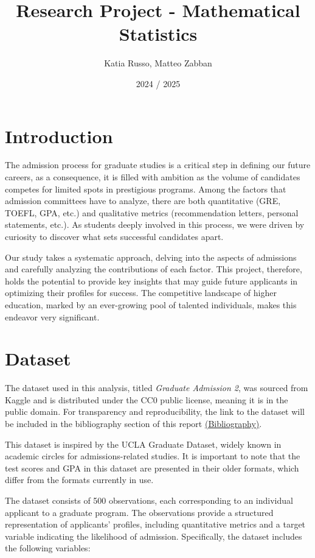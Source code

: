 \documentclass[12pt]{article}
\title{Research Project - Mathematical Statistics}
\author{Katia Russo, Matteo Zabban}
\date{2024 / 2025}
\begin{document}
\maketitle
\tableofcontents

\newpage
\section{Introduction}
The admission process for graduate studies is a critical step in defining our future careers, as a consequence, it is filled with ambition as the volume of candidates competes for limited spots in prestigious programs. Among the factors that admission committees have to analyze, there are both quantitative (GRE, TOEFL, GPA, etc.) and qualitative metrics (recommendation letters, personal statements, etc.). As students deeply involved in this process, we were driven by curiosity to discover what sets successful candidates apart.

\vspace{10pt}
\indent Our study takes a systematic approach, delving into the aspects of admissions and carefully analyzing the contributions of each factor. This project, therefore, holds the potential to provide key insights that may guide future applicants in optimizing their profiles for success. The competitive landscape of higher education, marked by an ever-growing pool of talented individuals, makes this endeavor very significant.


\section{Dataset}
The dataset used in this analysis, titled \textit{Graduate Admission 2}, was sourced from Kaggle and is distributed under the CC0 public license, meaning it is in the public domain. For transparency and reproducibility, the link to the dataset will be included in the bibliography section of this report \hyperref[b]{\scriptsize {(Bibliography)}}.

\vspace{10pt}
\indent This dataset is inspired by the UCLA Graduate Dataset, widely known in academic circles for admissions-related studies. It is important to note that the test scores and GPA in this dataset are presented in their older formats, which differ from the formats currently in use.

\vspace{10pt}
\indent The dataset consists of 500 observations, each corresponding to an individual applicant to a graduate program. The observations provide a structured representation of applicants’ profiles, including quantitative metrics and a target variable indicating the likelihood of admission. Specifically, the dataset includes the following variables:
\end{document}
